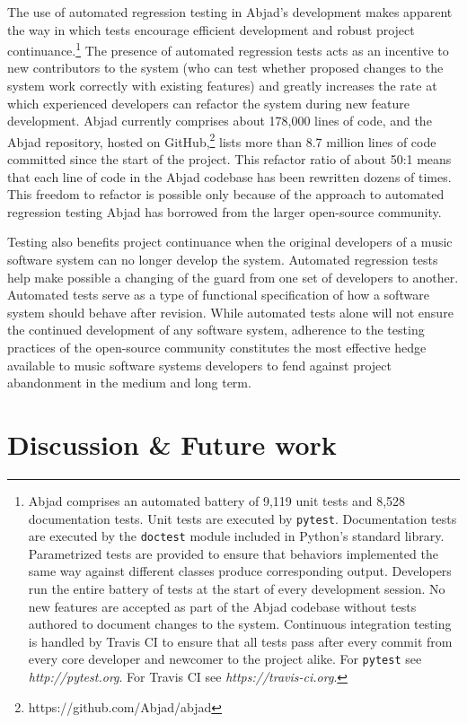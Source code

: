 \documentclass{article}
\begin{document}
The use of automated regression testing in Abjad's development makes apparent
the way in which tests encourage efficient development and robust project
continuance.\footnote{Abjad comprises an automated battery of 9,119 unit tests
and 8,528 documentation tests. Unit tests are executed by \texttt{pytest}.
Documentation tests are executed by the \texttt{doctest} module included in
Python's standard library. Parametrized tests are provided to ensure that
behaviors implemented the same way against different classes produce
corresponding output. Developers run the entire battery of tests at the start
of every development session. No new features are accepted as part of the Abjad
codebase without tests authored to document changes to the system. Continuous
integration testing is handled by Travis CI to ensure that all tests pass after every commit from every core developer and newcomer to the project alike.
For \texttt{pytest} see \textit{http://pytest.org}. For Travis CI see
\textit{https://travis-ci.org}.} The presence of automated regression tests acts as an incentive to new contributors
to the system (who can test whether proposed
changes to the system work correctly with existing features) and greatly increases the
rate at which experienced developers can refactor the system during new feature
development.
Abjad currently comprises about 178,000 lines of code, and the
Abjad repository, hosted on GitHub,\footnote{https://github.com/Abjad/abjad}
lists more than 8.7 million lines of code committed since the start of the
project. This refactor ratio of about 50:1 means that each line of code in the
Abjad codebase has been rewritten dozens of times. This freedom to refactor is
possible only because of the approach to automated regression testing Abjad has
borrowed from the larger open-source community.

Testing also benefits project continuance when the original developers of a
music software system can no longer develop the system. Automated regression
tests help make possible a changing of the guard from one set of developers to
another. Automated tests serve as a type of functional specification of how a
software system should behave after revision. While
automated tests alone will not ensure the continued development of any software
system, adherence to the testing practices of the open-source community
constitutes the most effective hedge available to music software systems
developers to fend against project abandonment in the medium and long term.

\section{Discussion \& Future work} \label{sec:discussion}
\end{document}
